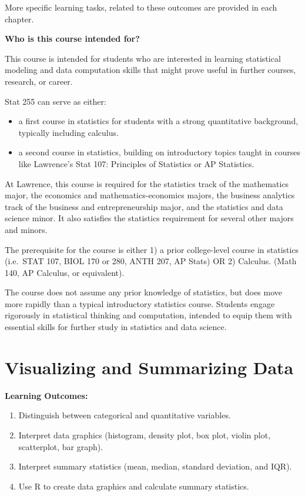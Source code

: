 \documentclass[
  letterpaper,
  DIV=11,
  numbers=noendperiod]{scrreprt}
\providecommand{\tightlist}{%
  \setlength{\itemsep}{0pt}\setlength{\parskip}{0pt}}\usepackage{longtable,booktabs,array}
\begin{document}
More specific learning tasks, related to these outcomes are provided in
each chapter.

\textbf{Who is this course intended for?}

This course is intended for students who are interested in learning
statistical modeling and data computation skills that might prove useful
in further courses, research, or career.

Stat 255 can serve as either:

\begin{itemize}
\item
  a first course in statistics for students with a strong quantitative
  background, typically including calculus.
\item
  a second course in statistics, building on introductory topics taught
  in courses like Lawrence's Stat 107: Principles of Statistics or AP
  Statistics.
\end{itemize}

At Lawrence, this course is required for the statistics track of the
mathematics major, the economics and mathematics-economics majors, the
business analytics track of the business and entrepreneurship major, and
the statistics and data science minor. It also satisfies the statistics
requirement for several other majors and minors.

The prerequisite for the course is either 1) a prior college-level
course in statistics (i.e.~STAT 107, BIOL 170 or 280, ANTH 207, AP
Stats) OR 2) Calculus. (Math 140, AP Calculus, or equivalent).

The course does not assume any prior knowledge of statistics, but does
move more rapidly than a typical introductory statistics course.
Students engage rigorously in statistical thinking and computation,
intended to equip them with essential skills for further study in
statistics and data science.


\chapter{Visualizing and Summarizing
Data}\label{visualizing-and-summarizing-data}

\textbf{Learning Outcomes:}

\begin{enumerate}
\def\labelenumi{\arabic{enumi}.}
\tightlist
\item
  Distinguish between categorical and quantitative variables.\\
\item
  Interpret data graphics (histogram, density plot, box plot, violin
  plot, scatterplot, bar graph).\\
\item
  Interpret summary statistics (mean, median, standard deviation, and
  IQR).
\item
  Use R to create data graphics and calculate summary statistics.
\end{enumerate}
\end{document}
